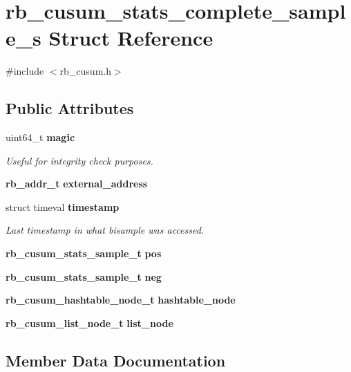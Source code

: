 \section{rb\+\_\+cusum\+\_\+stats\+\_\+complete\+\_\+sample\+\_\+s Struct Reference}
\label{structrb__cusum__stats__complete__sample__s}


{\ttfamily \#include $<$rb\+\_\+cusum.\+h$>$}

\subsection*{Public Attributes}
\begin{DoxyCompactItemize}
\item 
uint64\+\_\+t {\bf magic}
\begin{DoxyCompactList}\small\item\em Useful for integrity check purposes. \end{DoxyCompactList}\item 
{\bf rb\+\_\+addr\+\_\+t} {\bf external\+\_\+address}
\item 
struct timeval {\bf timestamp}
\begin{DoxyCompactList}\small\item\em Last timestamp in what bisample was accessed. \end{DoxyCompactList}\item 
{\bf rb\+\_\+cusum\+\_\+stats\+\_\+sample\+\_\+t} {\bf pos}
\item 
{\bf rb\+\_\+cusum\+\_\+stats\+\_\+sample\+\_\+t} {\bf neg}
\item 
{\bf rb\+\_\+cusum\+\_\+hashtable\+\_\+node\+\_\+t} {\bf hashtable\+\_\+node}
\item 
{\bf rb\+\_\+cusum\+\_\+list\+\_\+node\+\_\+t} {\bf list\+\_\+node}
\end{DoxyCompactItemize}


\subsection{Member Data Documentation}
